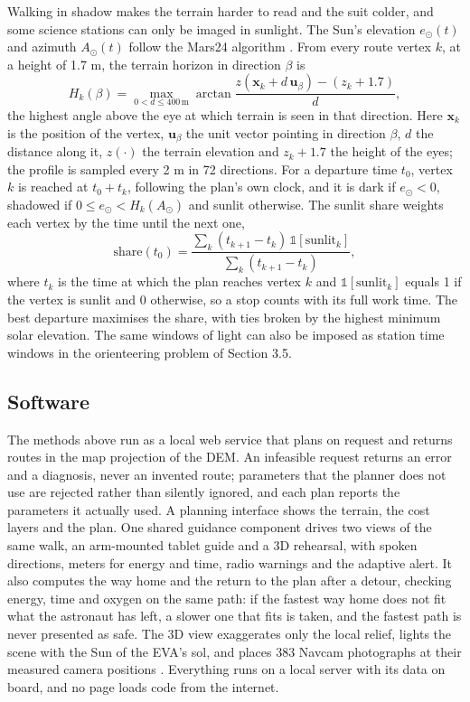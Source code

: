 \documentclass[11pt,a4paper]{article}
\begin{document}
Walking in shadow makes the terrain harder to read and the suit colder, and some science stations can only be imaged in sunlight. The Sun's elevation $e_\odot(t)$ and azimuth $A_\odot(t)$ follow the Mars24 algorithm \cite{Allison2000}. From every route vertex $k$, at a height of 1.7 m, the terrain horizon in direction $\beta$ is \[H_k(\beta) = \max_{0 < d \le 400\,\text{m}} \arctan\frac{z(\mathbf x_k + d\,\mathbf u_\beta) - (z_k + 1.7)}{d},\] the highest angle above the eye at which terrain is seen in that direction. Here $\mathbf x_k$ is the position of the vertex, $\mathbf u_\beta$ the unit vector pointing in direction $\beta$, $d$ the distance along it, $z(\cdot)$ the terrain elevation and $z_k + 1.7$ the height of the eyes; the profile is sampled every 2 m in 72 directions. For a departure time $t_0$, vertex $k$ is reached at $t_0 + t_k$, following the plan's own clock, and it is dark if $e_\odot < 0$, shadowed if $0 \le e_\odot < H_k(A_\odot)$ and sunlit otherwise. The sunlit share weights each vertex by the time until the next one, \[\text{share}(t_0) = \frac{\sum_k (t_{k+1} - t_k)\,\mathbb 1[\text{sunlit}_k]}{\sum_k (t_{k+1} - t_k)},\] where $t_k$ is the time at which the plan reaches vertex $k$ and $\mathbb 1[\text{sunlit}_k]$ equals 1 if the vertex is sunlit and 0 otherwise, so a stop counts with its full work time. The best departure maximises the share, with ties broken by the highest minimum solar elevation. The same windows of light can also be imposed as station time windows in the orienteering problem of Section 3.5.

\subsection{Software}

The methods above run as a local web service that plans on request and returns routes in the map projection of the DEM. An infeasible request returns an error and a diagnosis, never an invented route; parameters that the planner does not use are rejected rather than silently ignored, and each plan reports the parameters it actually used. A planning interface shows the terrain, the cost layers and the plan. One shared guidance component drives two views of the same walk, an arm-mounted tablet guide and a 3D rehearsal, with spoken directions, meters for energy and time, radio warnings and the adaptive alert. It also computes the way home and the return to the plan after a detour, checking energy, time and oxygen on the same path: if the fastest way home does not fit what the astronaut has left, a slower one that fits is taken, and the fastest path is never presented as safe. The 3D view exaggerates only the local relief, lights the scene with the Sun of the EVA's sol, and places 383 Navcam photographs at their measured camera positions \cite{MSL-raw,VICAR-CAHVOR}. Everything runs on a local server with its data on board, and no page loads code from the internet.
\end{document}
